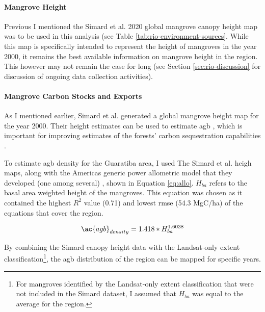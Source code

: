 \paragraph{Mangrove Height} \label{sec:rio-mangrove-height} \leavevmode\newline

Previous I mentioned the Simard et al. 2020 global mangrove canopy height map was to be used in this analysis (see Table \ref{tab:rio-environment-sources}. While this map is specifically intended to represent the height of mangroves in the year 2000, it remains the best available information on mangrove height in the region. This however may not remain the case for long (see Section \ref{sec:rio-discussion} for discussion of ongoing data collection activities).

\paragraph{Mangrove Carbon Stocks and Exports} \label{sec:rio-mangrove-carbon} \leavevmode\newline

As I mentioned earlier, Simard et al. generated a global mangrove height map for the year 2000. Their height estimates can be used to estimate \ac{agb} \cite{cloughAllometricRelationshipsEstimating1989, fatoyinboEstimatingMangroveAboveground2018}, which is important for improving estimates of the forests' carbon sequestration capabilities \cite{lagomasinoMeasuringMangroveCarbon2019, simardMangroveCanopyHeight2019}.

To estimate \ac{agb} density for the Guaratiba area, I used The Simard et al. heigh maps, along with the Americas generic power allometric model that they developed (one among several) \cite{simardMangroveCanopyHeight2019}, shown in Equation \ref{eq:allo}. $H_{ba}$ refers to the basal area weighted height of the mangroves. This equation was chosen as it contained the highest $R^2$ value (0.71) and lowest \ac{rmse} (54.3 MgC/ha) of the equations that cover the region. 

\begin{equation}
\label{eq:allo}
\ac{agb}_{density} = 1.418 * H_{ba}^{1.6038}
\end{equation}

By combining the Simard canopy height data with the Landsat-only extent classification\footnote{For mangroves identified by the Landsat-only extent classification that were not included in the Simard dataset, I assumed that $H_{ba}$ was equal to the average for the region.}, the \ac{agb} distribution of the region can be mapped for specific years.

